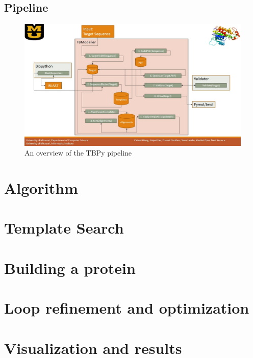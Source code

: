 \documentclass{article}
\begin{document}
\subsection{Pipeline}
\begin{figure}[H]
\begin{center}
\includegraphics[width=\textwidth]{workflow}
\caption{An overview of the TBPy pipeline}
\label{Fig:blosum}
\end{center}
\end{figure}

\section{Algorithm}

\section{Template Search}

\section{Building a protein}

\section{Loop refinement and optimization}

\section{Visualization and results}
\end{document}
